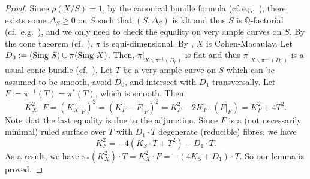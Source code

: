 \begin{proof}
Since $\rho(X/S)=1$, by the  canonical bundle formula (cf.\,e.g.~\cite[Theorem 0.2]{Amb05}), there exists some  $\Delta_S\geqslant 0$ on $S$ such that $(S,\Delta_S)$ is klt and thus $S$ is $\mathbb{Q}$-factorial (cf.~e.g.~\cite[Proposition 4.11]{KM98}), and
we only need to check the equality  on very ample curves  on $S$. %
By the cone theorem (cf.~\cite[Theorem 3.7]{KM98}), $\pi$ is equi-dimensional.
By \cite[Theorem 5.10]{KM98}, $X$ is Cohen-Macaulay.
Let $D_0:=(\textup{Sing}~S)\cup\pi(\textup{Sing}~X)$.
Then, $\pi|_{X\backslash\pi^{-1}(D_0)}$ is flat %
and thus $\pi|_{X\backslash\pi^{-1}(D_0)}$ is a usual conic bundle  (cf.~\cite[(1.5)]{Sar82}).  
Let $T$ be a very ample curve on $S$ which can be assumed to be smooth, avoid $D_0$, and intersect with $D_1$ transversally. 
Let $F:=\pi^{-1}(T)=\pi^*(T)$, which is smooth.
Then 
$$K_X^2\cdot F=(K_X|_F)^2=(K_F-F|_F)^2=K_F^2-2K_F\cdot (F|_F)=K_F^2+4T^2.$$ 
Note that the last equality is due to the adjunction.
Since $F$ is a (not necessarily minimal) ruled surface over $T$ with $D_1
\cdot T$ degenerate  (reducible) fibres, we have
$$K_F^2=-4(K_S\cdot T+T^2)-D_1\cdot T.$$ 
As a result, we have $\pi_*(K_X^2)\cdot T=K_X^2\cdot F=-(4K_S+D_1)\cdot T$.
So our lemma is proved.
\end{proof}




